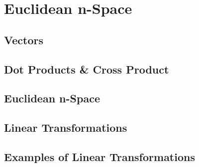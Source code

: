 \documentclass[../satmath.tex]{subfiles}
\begin{document}
\chapter{Euclidean n-Space}
\section{Vectors}
\section{Dot Products \& Cross Product}
\section{Euclidean n-Space}
\section{Linear Transformations}
\section{Examples of Linear Transformations}
\end{document}
